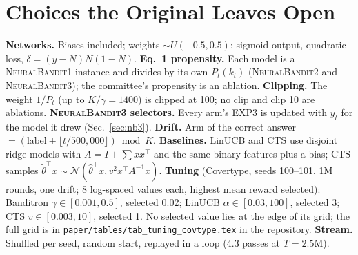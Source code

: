 \documentclass[sigconf]{acmart}
\newcommand{\NB}{\textsc{NeuralBandit}}
\begin{document}
\section{Choices the Original Leaves Open}\label{app:choices}
\textbf{Networks.} Biases included; weights $\sim U(-0.5,0.5)$; sigmoid output, quadratic loss,
$\delta=(y-N)N(1-N)$. \textbf{Eq.~1 propensity.} Each model is a \NB{}1 instance and divides by its own
$P_t(k_t)$ (\NB{}2 and \NB{}3); the committee's propensity is an ablation. \textbf{Clipping.} The weight
$1/P_t$ (up to $K/\gamma=1400$) is clipped at 100; no clip and clip 10 are ablations. \textbf{\NB{}3 selectors.} Every
arm's EXP3 is updated with $y_t$ for the model it drew (Sec.~\ref{sec:nb3}). \textbf{Drift.} Arm of the correct answer
$=(\text{label}+\lfloor t/500{,}000\rfloor)\bmod K$. \textbf{Baselines.} LinUCB and CTS use disjoint ridge models with
$A=I+\sum xx^\top$ and the same binary features plus a bias; CTS samples $\tilde\theta^\top x\sim
\mathcal N(\hat\theta^\top x, v^2x^\top A^{-1}x)$. \textbf{Tuning} (Covertype, seeds 100--101, 1M rounds, one drift; 8
log-spaced values each, highest mean reward selected): Banditron $\gamma\in[0.001,0.5]$, selected 0.02; LinUCB
$\alpha\in[0.03,100]$, selected 3; CTS $v\in[0.003,10]$, selected 1. No selected value lies at the edge of its grid;
the full grid is in \texttt{paper/tables/tab\_tuning\_covtype.tex} in the repository.
\textbf{Stream.} Shuffled per seed, random start, replayed in a loop (4.3 passes at $T=2.5$M).
\end{document}
